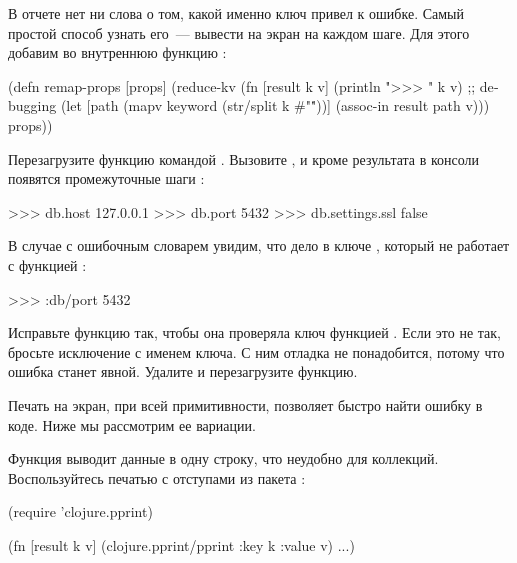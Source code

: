 \fi

В отчете нет ни слова о том, какой именно ключ привел к ошибке. Самый простой способ узнать его~--- вывести на экран на каждом шаге. Для этого добавим  во внутреннюю функцию  :

\begin{english}
  \begin{clojure/lines}
(defn remap-props [props]
  (reduce-kv
   (fn [result k v]
     (println ">>> " k v) ;; debugging
     (let [path
           (mapv keyword (str/split k #"\."))]
       (assoc-in result path v)))
   {}
   props))
  \end{clojure/lines}
\end{english}

Перезагрузите функцию командой . Вызовите , и кроме результата в консоли появятся промежуточные шаги :

\begin{english}
  \begin{text}
>>>  db.host 127.0.0.1
>>>  db.port 5432
>>>  db.settings.ssl false
  \end{text}
\end{english}

В случае с ошибочным словарем увидим, что дело в ключе , который не работает с функцией :

\begin{english}
  \begin{text}
>>>  :db/port 5432
  \end{text}
\end{english}

Исправьте функцию так, чтобы она проверяла ключ функцией . Если это не так, бросьте исключение с именем ключа. С ним отладка не понадобится, потому что ошибка станет явной. Удалите  и перезагрузите функцию.

Печать на экран, при всей примитивности, позволяет быстро найти ошибку в коде. Ниже мы рассмотрим ее вариации.

Функция  выводит данные в одну строку, что неудобно для коллекций. Воспользуйтесь печатью с отступами из пакета :

\begin{english}
  \begin{clojure}
(require 'clojure.pprint)

(fn [result k v]
  (clojure.pprint/pprint
    {:key k :value v})
  ...)
  \end{clojure}
\end{english}


